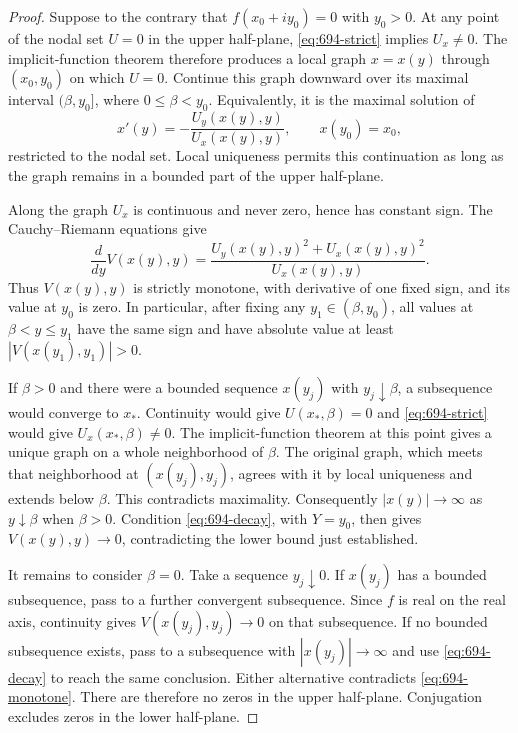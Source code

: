 \documentclass[11pt,a4paper]{article}
\theoremstyle{remark}
\begin{document}
\begin{proof}
Suppose to the contrary that $f(x_0+iy_0)=0$ with $y_0>0$.
At any point of the nodal set $U=0$ in the upper half-plane,
\eqref{eq:694-strict} implies $U_x\ne0$.  The implicit-function theorem
therefore produces a local graph $x=x(y)$ through $(x_0,y_0)$ on which
$U=0$.  Continue this graph downward over its maximal interval
$(\beta,y_0]$, where $0\le\beta<y_0$.
Equivalently, it is the maximal solution of
\[
 x'(y)=-\frac{U_y(x(y),y)}{U_x(x(y),y)},\qquad x(y_0)=x_0,
\]
restricted to the nodal set.  Local uniqueness permits this continuation
as long as the graph remains in a bounded part of the upper half-plane.

Along the graph $U_x$ is continuous and never zero, hence has constant
sign.  The Cauchy--Riemann equations give
\begin{equation}
 \frac{d}{dy}V(x(y),y)
 =\frac{U_y(x(y),y)^2+U_x(x(y),y)^2}{U_x(x(y),y)}.
 \label{eq:694-monotone}
\end{equation}
Thus $V(x(y),y)$ is strictly monotone, with derivative of one fixed
sign, and its value at $y_0$ is zero.  In particular, after fixing any
$y_1\in(\beta,y_0)$, all values at $\beta<y\le y_1$ have the same sign
and have absolute value at least $|V(x(y_1),y_1)|>0$.

If $\beta>0$ and there were a bounded sequence $x(y_j)$ with
$y_j\downarrow\beta$, a subsequence would converge to $x_*$.  Continuity
would give $U(x_*,\beta)=0$ and \eqref{eq:694-strict} would give
$U_x(x_*,\beta)\ne0$.  The implicit-function theorem at this point gives
a unique graph on a whole neighborhood of $\beta$.  The original graph,
which meets that neighborhood at $(x(y_j),y_j)$, agrees with it by local
uniqueness and extends below $\beta$.  This contradicts maximality.
Consequently $|x(y)|\to\infty$ as $y\downarrow\beta$ when $\beta>0$.
Condition \eqref{eq:694-decay}, with $Y=y_0$, then gives
$V(x(y),y)\to0$, contradicting the lower bound just established.

It remains to consider $\beta=0$.  Take a sequence $y_j\downarrow0$.
If $x(y_j)$ has a bounded subsequence, pass to a further convergent
subsequence.  Since $f$ is real on the real axis, continuity gives
$V(x(y_j),y_j)\to0$ on that subsequence.  If no bounded subsequence
exists, pass to a subsequence with $|x(y_j)|\to\infty$ and use
\eqref{eq:694-decay} to reach the same conclusion.  Either alternative
contradicts \eqref{eq:694-monotone}.  There are therefore no zeros in the
upper half-plane.  Conjugation excludes zeros in the lower half-plane.
\end{proof}
\end{document}
